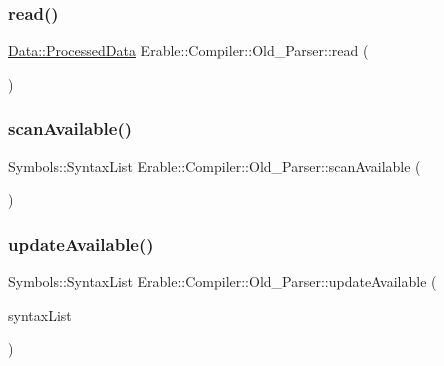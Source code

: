 \mbox{\label{class_erable_1_1_compiler_1_1_old___parser_a591695085aaff057e5fbfcbb4ac1d72e}} 
\subsubsection{\texorpdfstring{read()}{read()}}
{\footnotesize\ttfamily \mbox{\hyperlink{struct_erable_1_1_compiler_1_1_data_1_1_processed_data}{Data\+::\+Processed\+Data}} Erable\+::\+Compiler\+::\+Old\+\_\+\+Parser\+::read (\begin{DoxyParamCaption}{ }\end{DoxyParamCaption})}

\mbox{\label{class_erable_1_1_compiler_1_1_old___parser_ab0f475bddc9180e53ceb540f5e79fe48}} 
\subsubsection{\texorpdfstring{scanAvailable()}{scanAvailable()}}
{\footnotesize\ttfamily Symbols\+::\+Syntax\+List Erable\+::\+Compiler\+::\+Old\+\_\+\+Parser\+::scan\+Available (\begin{DoxyParamCaption}\item[{\mbox{\hyperlink{namespace_erable_1_1_compiler_1_1_symbols_a8f0bc762f448ea4d84e8713ab3e140b9}{Symbols\+::\+Symbol\+Ptr}}}]{ }\end{DoxyParamCaption})\hspace{0.3cm}{\ttfamily [static]}}

\mbox{\label{class_erable_1_1_compiler_1_1_old___parser_a13282e8f2853da91ca8eaba83d5d6791}} 
\subsubsection{\texorpdfstring{updateAvailable()}{updateAvailable()}}
{\footnotesize\ttfamily Symbols\+::\+Syntax\+List Erable\+::\+Compiler\+::\+Old\+\_\+\+Parser\+::update\+Available (\begin{DoxyParamCaption}\item[{Symbols\+::\+Syntax\+List}]{syntax\+List }\end{DoxyParamCaption})\hspace{0.3cm}{\ttfamily [static]}}



